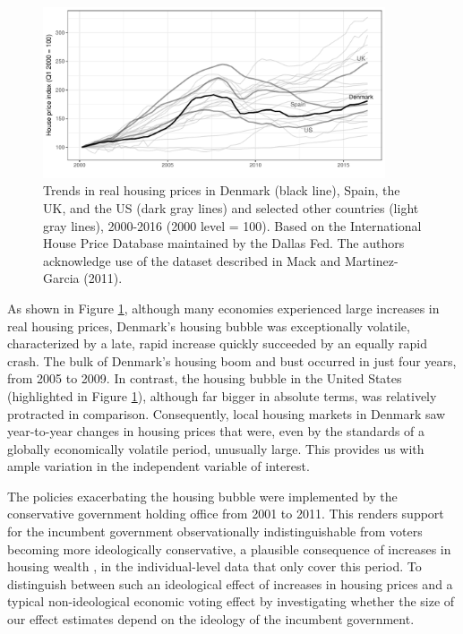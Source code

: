 \documentclass[12pt,a4paper]{article}
\begin{document}
	\begin{figure}[htbp!]
		\includegraphics[width=0.9\textwidth]{../figures/timeplot}
		\centering
		\caption{Trends in real housing prices in Denmark (black line), Spain, the UK, and the US (dark gray lines) and selected other countries (light gray lines), 2000-2016 (2000 level = 100). Based on the International House Price Database maintained by the Dallas Fed. The authors acknowledge use of the dataset described in Mack and Martinez-Garcia (2011).}\label{hpd}
	\end{figure}
	
	As shown in Figure \ref{hpd}, although many economies experienced large increases in real housing prices, Denmark's housing bubble was exceptionally volatile, characterized by a late, rapid increase quickly succeeded by an equally rapid crash. The bulk of Denmark's housing boom and bust occurred in just four years, from 2005 to 2009. In contrast, the housing bubble in the United States (highlighted in Figure \ref{hpd}), although far bigger in absolute terms, was relatively protracted in comparison. Consequently, local housing markets in Denmark saw year-to-year changes in housing prices that were, even by the standards of a globally economically volatile period, unusually large. This provides us with ample variation in the independent variable of interest.
	
	The policies exacerbating the housing bubble were implemented by the conservative government holding office from 2001 to 2011. This renders support for the incumbent government observationally indistinguishable from voters becoming more ideologically conservative, a plausible consequence of increases in housing wealth \citep{ansell2014political}, in the individual-level data that only cover this period. To distinguish between such an ideological effect of increases in housing prices and a typical non-ideological economic voting effect by investigating whether the size of our effect estimates depend on the ideology of the incumbent government. 
	
\end{document}
